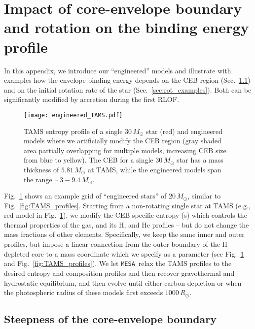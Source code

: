 \documentclass[twocolumn,twocolappendix,trackchanges]{aastex63}
\newcommand{\code}[1]{\texttt{#1}}
\newcommand{\mesa}{\code{MESA}}
\DeclareRobustCommand{\Figref}[1]{Fig.~\ref{#1}}
\DeclareRobustCommand{\Secref}[1]{Sec.~\ref{#1}}
\begin{document}



\appendix
\section{Impact of core-envelope boundary and rotation on the binding  energy profile}
\label{sec:toy_models}

In this appendix, we introduce our ``engineered'' models and
illustrate with examples how the
envelope binding energy depends on the CEB
region
(\Secref{sec:eng_examples}) and on the initial rotation rate of the
star (\Secref{sec:rot_examples}). Both can be significantly modified
by accretion during the first RLOF.

\begin{figure}[hbtp]
  \texttt{[image: engineered\_TAMS.pdf]}
  \caption{TAMS entropy profile of a single 30\,$M_\odot$ star (red)
    and engineered models where we artificially modify the CEB region
    (gray shaded area partially overlapping for multiple models,
    increasing CEB size from blue to yellow). The CEB for a single
  $30\,M_\odot$ star has a mass thickness of $5.81\,M_\odot$ at TAMS,
  while the engineered models span the range $\sim3-9.4\,M_\odot$.}
  \label{fig:engineered_TAMS}
\end{figure}

\Figref{fig:engineered_TAMS} shows an example grid of ``engineered
stars'' of $20\,M_\odot$, similar to \Figref{fig:TAMS_profiles}.
Starting from a non-rotating single star at TAMS (e.g., red model in
\Figref{fig:engineered_TAMS}), we modify the CEB specific entropy (s)
which controls the thermal properties of the gas, and its H, and He
profiles -- but do not change the mass fractions of other elements.
Specifically, we keep the same inner and outer profiles, but impose a
linear connection from the outer boundary of the H-depleted core to a
mass coordinate which we specify as a parameter (see
\Figref{fig:engineered_TAMS} and \Figref{fig:TAMS_profiles}). We let \mesa\ relax
the TAMS profiles to the desired entropy and composition profiles and
then recover gravothermal and hydrostatic equilibrium, and then evolve
until either carbon depletion or when the photospheric radius of these
models first exceeds
$1000\,R_\odot$.

\subsection{Steepness of the core-envelope boundary}
\label{sec:eng_examples}
\end{document}
